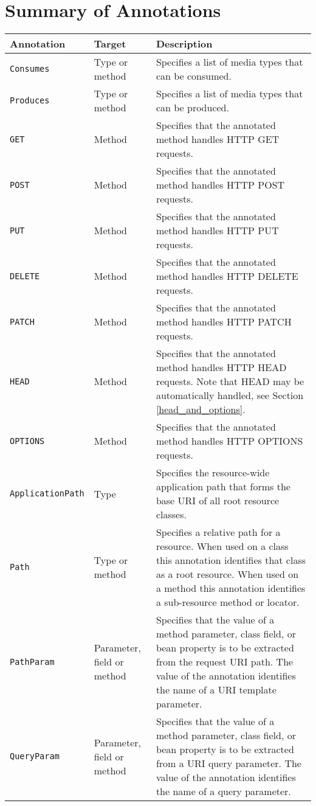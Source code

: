 \chapter{Summary of Annotations}
\label{annotation_table}
\begin{longtable}{|l|p{1.2in}|p{3.5in}|}
\hline
 Annotation &  Target &  Description \tabularnewline
\hline\hline\endhead
\lstinline{Consumes} & \raggedright Type or method & \raggedright Specifies a list of media types that can be consumed. \tabularnewline
\hline
\lstinline{Produces} & \raggedright Type or method & \raggedright Specifies a list of media types that can be produced. \tabularnewline
\hline
\lstinline{GET} & \raggedright Method & \raggedright Specifies that the annotated method handles HTTP GET requests.  \tabularnewline
\hline
\lstinline{POST} & \raggedright Method & \raggedright Specifies that the annotated method handles HTTP POST requests.  \tabularnewline
\hline
\lstinline{PUT} & \raggedright Method & \raggedright Specifies that the annotated method handles HTTP PUT requests.  \tabularnewline
\hline
\lstinline{DELETE} & \raggedright Method & \raggedright Specifies that the annotated method handles HTTP DELETE requests.  \tabularnewline
\hline
\lstinline{PATCH} & \raggedright Method & \raggedright Specifies that the annotated method handles HTTP PATCH requests.  \tabularnewline
\hline
\lstinline{HEAD} & \raggedright Method & \raggedright Specifies that the annotated method handles HTTP HEAD requests. Note that HEAD may be automatically handled, see Section \ref{head_and_options}. \tabularnewline
\hline
\lstinline{OPTIONS} & \raggedright Method & \raggedright Specifies that the annotated method handles HTTP OPTIONS requests.  \tabularnewline
\hline
\lstinline{ApplicationPath} & \raggedright Type & \raggedright Specifies the resource-wide application path that forms the base URI of all root resource classes. \tabularnewline
\hline
\lstinline{Path} & \raggedright Type or method & \raggedright Specifies a relative path for a resource. When used on a class this annotation identifies that class as a root resource. When used on a method this annotation identifies a sub-resource method or locator. \tabularnewline
\hline
\lstinline{PathParam} & \raggedright Parameter, field or method & \raggedright Specifies that the value of a method parameter, class field, or bean property is to be extracted from the request URI path. The value of the annotation identifies the name of a URI template parameter.\tabularnewline
\hline
\lstinline{QueryParam} & \raggedright Parameter, field or method & \raggedright Specifies that the value of a method parameter, class field, or bean property is to be extracted from a URI query parameter. The value of the annotation identifies the name of a query parameter. \tabularnewline

\end{longtable}
